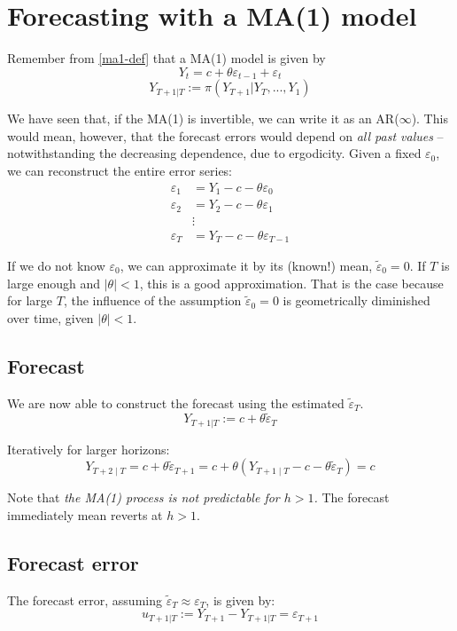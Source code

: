 \documentclass[11pt, a4paper]{report}
\theoremstyle{plain}
\theoremstyle{plain}
\theoremstyle{remark}
\begin{document}
\section{Forecasting with a MA(1) model}

Remember from \ref{ma1-def} that a MA(1) model is given by
$$ Y_t = c + \theta \varepsilon_{t-1} + \varepsilon_{t} $$
$$ Y_{T+1|T} := \pi(Y_{T+1} | Y_T,..., Y_1) $$

We have seen that, if the MA(1) is invertible, we can write it as an AR($\infty$). This would mean, however, that the forecast errors would depend on \textit{all past values} -- notwithstanding the decreasing dependence, due to ergodicity. Given a fixed $\varepsilon_{0}$, we can reconstruct the entire error series: 
$$\begin{aligned}
	\varepsilon_{1} &=Y_{1}-c-\theta \varepsilon_{0} \\
	\varepsilon_{2} &=Y_{2}-c-\theta \varepsilon_{1} \\
	& \vdots \\
	\varepsilon_{T} &=Y_{T}-c-\theta \varepsilon_{T-1}
\end{aligned}$$

If we do not know $\varepsilon_{0}$, we can approximate it by its (known!) mean, $\tilde{\varepsilon}_0 = 0$. If $T$ is large enough and $|\theta| < 1$, this is a good approximation. That is the case because for large $T$, the influence of the assumption $\tilde{\varepsilon}_0 = 0$ is geometrically diminished over time, given $|\theta| < 1$. 


\subsection{Forecast}

We are now able to construct the forecast using the estimated $\tilde{\varepsilon}_T$.
$$ Y_{T+1|T} := c + \theta \tilde{\varepsilon}_T $$

Iteratively for larger horizons:
$$Y_{T+2 \mid T}=c+\theta \widetilde{\varepsilon}_{T+1}=c+\theta\left(Y_{T+1 \mid T}-c-\theta \widetilde{\varepsilon}_{T}\right)=c$$

Note that \textit{the MA(1) process is not predictable for $h > 1$.} The forecast immediately mean reverts at $h>1$.

\subsection{Forecast error}

The forecast error, assuming $\tilde{\varepsilon}_T \approx \varepsilon_{T}$, is given by: 
$$ u_{T+1|T} := Y_{T+1} - Y_{T+1|T} = \varepsilon_{T+1}$$
\end{document}
